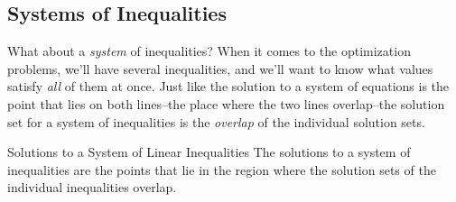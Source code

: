\subsection{Systems of Inequalities}
What about a \emph{system} of inequalities?  When it comes to the optimization problems, we'll have several inequalities, and we'll want to know what values satisfy \emph{all} of them at once.  Just like the solution to a system of equations is the point that lies on both lines--the place where the two lines overlap--the solution set for a system of inequalities is the \emph{overlap} of the individual solution sets.

\begin{proc}{Solutions to a System of Linear Inequalities}
The solutions to a system of inequalities are the points that lie in the region where the solution sets of the individual inequalities overlap.
\end{proc}

